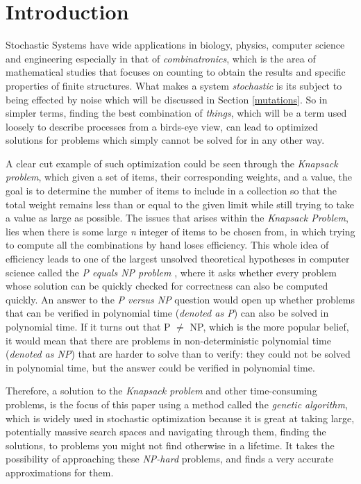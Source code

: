 \section{Introduction}
\label{sec:introduction}

Stochastic Systems have wide applications in biology, physics, computer science and engineering especially in that of \emph{combinatronics}, which is the area of mathematical studies that focuses on counting to obtain the results and specific properties of finite structures. 
What makes a system \emph{stochastic} is its subject to being effected by noise which will be discussed in Section \ref{mutations}.  
So in simpler terms, finding the best combination of \emph{things}, which will be a term used loosely to describe processes from a birds-eye view, can lead to optimized solutions for problems which simply cannot be solved for in any other way. 
 
A clear cut example of such optimization could be seen through the \emph{Knapsack problem}, which given a set of items, their corresponding weights, and a value, the goal is to determine the number of items to include in a collection so that the total weight remains less than or equal to the given limit while still trying to take a value as large as possible. 
The issues that arises within the \emph{Knapsack Problem}, lies when there is some large \emph{n} integer of items to be chosen from, in which trying to compute all the combinations by hand loses efficiency. 
This whole idea of efficiency leads to one of the largest unsolved theoretical hypotheses in computer science called the \emph{P equals NP problem} \cite{Fortnow}, where it asks whether every problem whose solution can be quickly checked for correctness can also be computed quickly.
An answer to the \emph{P versus NP} question would open up whether problems that can be verified in polynomial time (\emph{denoted as P}) can also be solved in polynomial time. If it turns out that P $\neq$ NP, which is the more popular belief, it would mean that there are problems in non-deterministic polynomial time (\emph{denoted as NP}) that are harder to solve than to verify: they could not be solved in polynomial time, but the answer could be verified in polynomial time. 

Therefore, a solution to the \emph{Knapsack problem} and other time-consuming problems, is the focus of this paper using a method called the \emph{genetic algorithm}, which is widely used in stochastic optimization because it is great at taking large, potentially massive search spaces and navigating through them, finding the solutions, to problems you might not find otherwise in a lifetime. It takes the possibility of approaching these \emph{NP-hard} problems, and finds a very accurate approximations for them.

